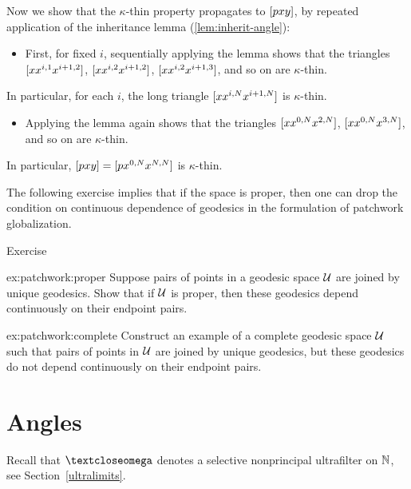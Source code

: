 Now we show that the $\kappa$-thin property propagates to $[{p}{x}{y}]$, by repeated application of the inheritance lemma (\ref{lem:inherit-angle}):
\begin{itemize}
\item 
First, for fixed $i$, 
sequentially applying the lemma shows  that the triangles 
$[{x}{x^{i,1}}{x^{i+1,2}}]$, 
$[{x}{x^{i,2}}{x^{i+1,2}}]$, 
$[{x}{x^{i,2}}{x^{i+1,3}}]$,
and so on are $\kappa$-thin. 
\end{itemize}
In particular, for each $i$, the long triangle $[{x}{x^{i,N}}{x^{i+1,N}}]$ is $\kappa$-thin.
\begin{itemize} 
\item 
Applying the lemma again shows that the  triangles $[{x}{x^{0,N}}{x^{2,N}}]$, $[{x}{x^{0,N}}{x^{3,N}}]$, and so on are $\kappa$-thin. 
\end{itemize}
In particular, $[{p}{x}{y}]=[{p}{x^{0,N}}{x^{N,N}}]$ is $\kappa$-thin.
\qeds

The following exercise implies that if the space is proper, then one can drop the condition on continuous dependence of geodesics in the formulation of patchwork globalization.

\begin{thm}{Exercise}\label{ex:patchwork}
\begin{subthm}{ex:patchwork:proper}
Suppose pairs of points in a geodesic space $\mathcal{U}$ are joined by unique geodesics.
Show that if $\mathcal{U}$ is proper, then 
these geodesics depend continuously on their endpoint pairs.
\end{subthm}

\begin{subthm}{ex:patchwork:complete}
Construct an example of a complete geodesic space $\mathcal{U}$ such that 
pairs of points in $\mathcal{U}$ are joined by unique geodesics, but
these geodesics do not depend continuously on their endpoint pairs.
\end{subthm}
\end{thm}




\section{Angles}
\label{sec:angles-cba}

Recall that $\o$ denotes a selective nonprincipal ultrafilter on $\mathbb{N}$, see Section~\ref{ultralimits}. 

